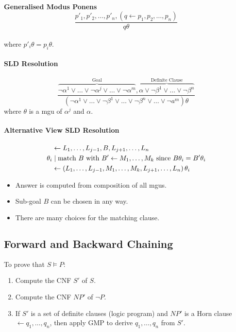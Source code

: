 \documentclass[twocolumn,english]{article}
\begin{document}
\paragraph{Generalised Modus Ponens
\[
\dfrac{p'_{1},p'_{2},\dots,p'_{n},\left(q\leftarrow p_{1},p_{2},\dots,p_{n}\right)}{q\theta}
\]
}

where $p'_{i}\theta=p_{i}\theta$.

\paragraph{SLD Resolution}

\[
\dfrac{\overbrace{\lnot\alpha^{1}\lor\dots\lor\lnot\alpha^{j}\lor\dots\lor\lnot\alpha^{m}}^{\text{Goal}},\overbrace{\alpha\lor\lnot\beta^{1}\lor\dots\lor\lnot\beta^{n}}^{\text{Definite Clause}}}{\left(\lnot\alpha^{1}\lor\dots\lor\lnot\beta^{1}\lor\dots\lor\lnot\beta^{n}\lor\dots\lor\lnot a^{m}\right)\theta}
\]
where $\theta$ is a mgu of $\alpha^{j}$ and $\alpha$.

\paragraph{Alternative View SLD Resolution}

\begin{align*}
\: & \leftarrow L_{1},\dots,L_{j-1},B,L_{j+1},\dots,L_{n}\\
\theta_{i} & \mid\text{match \ensuremath{B} with \ensuremath{B'\leftarrow M_{1},\dots,M_{k}} since \ensuremath{B\theta_{i}=B'\theta_{i}}}\\
\: & \leftarrow\left(L_{1},\dots,L_{j-1},M_{1},\dots,M_{k},L_{j+1},\dots,L_{n}\right)\theta_{i}
\end{align*}
\begin{itemize}
\item Answer is computed from composition of all mgus.
\item Sub-goal $B$ can be chosen in any way.
\item There are many choices for the matching clause.
\end{itemize}

\subsection{Forward and Backward Chaining}

To prove that $S\vDash P$:
\begin{enumerate}
\item Compute the CNF $S'$ of $S$.
\item Compute the CNF $NP'$ of $\lnot P$.
\item If $S'$ is a set of definite clauses (logic program) and $NP'$ is
a Horn clause $\leftarrow q_{1},\dots,q_{n}$, then apply GMP to derive
$q_{1},\dots,q_{n}$ from $S'$.
\end{enumerate}
\end{document}
